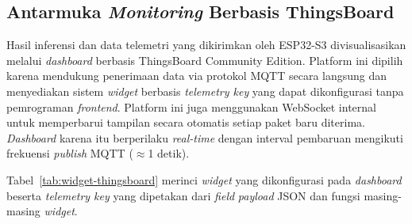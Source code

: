 \subsection{Antarmuka \textit{Monitoring} Berbasis ThingsBoard}

Hasil inferensi dan data telemetri yang dikirimkan oleh ESP32-S3
divisualisasikan melalui \textit{dashboard} berbasis ThingsBoard
Community Edition. Platform ini dipilih karena mendukung penerimaan
data via protokol MQTT secara langsung dan menyediakan sistem \textit{widget}
berbasis \textit{telemetry key} yang dapat dikonfigurasi tanpa
pemrograman \textit{frontend}. Platform ini juga menggunakan WebSocket internal
untuk memperbarui tampilan secara otomatis setiap paket baru diterima.
\textit{Dashboard} karena itu berperilaku \textit{real-time} dengan
interval pembaruan mengikuti frekuensi \textit{publish} MQTT ($\approx$1 detik).

Tabel~\ref{tab:widget-thingsboard} merinci \textit{widget} yang dikonfigurasi
pada \textit{dashboard} beserta \textit{telemetry key} yang dipetakan
dari \textit{field} \textit{payload} JSON dan fungsi masing-masing \textit{widget}.

